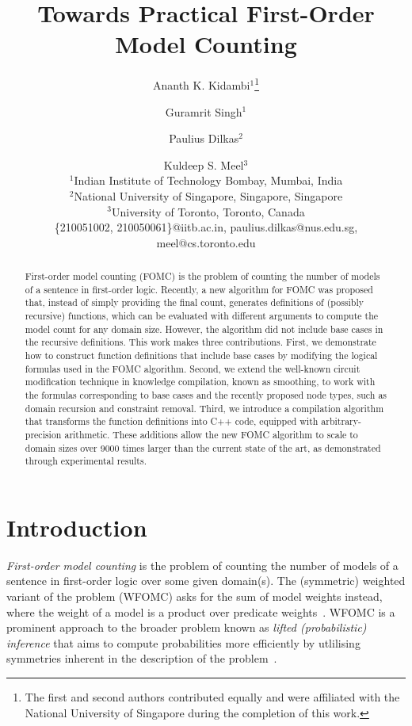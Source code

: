 \documentclass{article}
\title{Towards Practical First-Order Model Counting}
\author{%
  Ananth K. Kidambi$^1$\footnote{The first and second authors contributed equally and were affiliated with the National University of Singapore during the completion of this work.}\and
Guramrit Singh$^1$\and
Paulius Dilkas$^2$\and
Kuldeep S. Meel$^3$ \\
\affiliations
$^1$Indian Institute of Technology Bombay, Mumbai, India\\
$^2$National University of Singapore, Singapore, Singapore\\
$^3$University of Toronto, Toronto, Canada\\
\emails
\{210051002, 210050061\}@iitb.ac.in,
paulius.dilkas@nus.edu.sg,
meel@cs.toronto.edu
}
\theoremstyle{remark}
\begin{document}
\maketitle

\begin{abstract}
  First-order model counting (FOMC) is the problem of counting the number of
  models of a sentence in first-order logic. Recently, a new algorithm for FOMC
  was proposed that, instead of simply providing the final count, generates
  definitions of (possibly recursive) functions, which can be evaluated with
  different arguments to compute the model count for any domain size. However,
  the algorithm did not include base cases in the recursive definitions. This
  work makes three contributions. First, we demonstrate how to construct
  function definitions that include base cases by modifying the logical formulas
  used in the FOMC algorithm. Second, we extend the well-known circuit
  modification technique in knowledge compilation, known as smoothing, to work
  with the formulas corresponding to base cases and the recently proposed node
  types, such as domain recursion and constraint removal. Third, we introduce a
  compilation algorithm that transforms the function definitions into C++ code,
  equipped with arbitrary-precision arithmetic. These additions allow the new
  FOMC algorithm to scale to domain sizes over \num{9000} times larger than the
  current state of the art, as demonstrated through experimental results.
\end{abstract}

\section{Introduction}


\emph{First-order model counting} is the problem of counting the number of
models of a sentence in first-order logic over some given domain(s). The
(symmetric) weighted variant of the problem (WFOMC) asks for the sum of model
weights instead, where the weight of a model is a product over predicate
weights~\cite{DBLP:conf/ijcai/BroeckTMDR11}. WFOMC is a prominent approach to
the broader problem known as \emph{lifted (probabilistic) inference} that aims
to compute probabilities more efficiently by utlilising symmetries inherent in
the description of the problem~\cite{DBLP:conf/ecai/Kersting12}.

\end{document}
